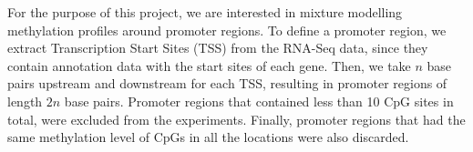 For the purpose of this project, we are interested in mixture modelling methylation profiles around promoter regions. To define a promoter region, we extract Transcription Start Sites (TSS) from the RNA-Seq data, since they contain annotation data with the start sites of each gene. Then, we take $n$ base pairs upstream and downstream for each TSS, resulting in promoter regions of length $2n$ base pairs. Promoter regions that contained less than 10 CpG sites in total, were excluded from the experiments. Finally, promoter regions that had the same methylation level of CpGs in all the locations were also discarded. 

